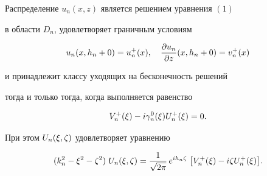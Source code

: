 \begin{lem}


Распределение $u_n(x,z)$ является решением уравнения $(1)$


в области $D_n$, удовлетворяет граничным условиям


\begin{equation}


u_n(x,h_n+0) = u^+_n(x),\quad


\frac{\pa u_n}{\pa z}(x,h_n+0) = v^+_n(x)


\end{equation}


и принадлежит классу уходящих на бесконечность решений


тогда и только тогда, когда выполняется равенство


\begin{equation}


V^+_n(\xi)-i\gaoxi{n}U^+_n(\xi) = 0 .


\end{equation}


При этом $U_n(\xi,\zeta)$ удовлетворяет уравнению


\begin{equation}


(k_n^2-\xi^2-\dz^2)\;U_n(\xi,\dz) =


\frac{1}{\sqrt{2\pi}}\,e^{ih_n\dz}\;


\bigl[ V^+_n(\xi)-i\dz U^+_n(\xi) \bigr] .


\end{equation}


\end{lem}





